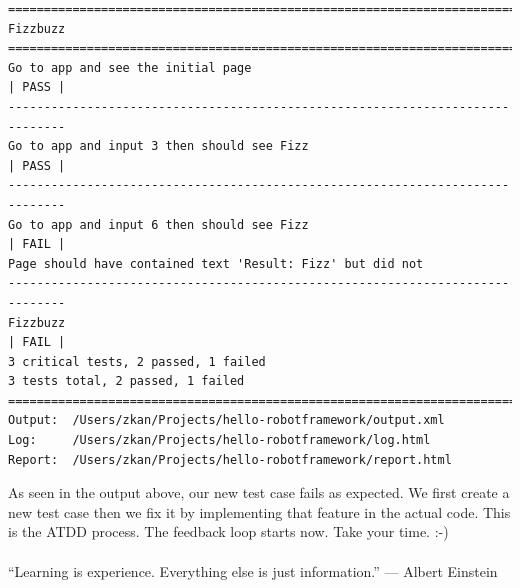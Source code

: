 \documentclass{article}
\begin{document}
\begin{verbatim}
==============================================================================
Fizzbuzz
==============================================================================
Go to app and see the initial page                                    | PASS |
------------------------------------------------------------------------------
Go to app and input 3 then should see Fizz                            | PASS |
------------------------------------------------------------------------------
Go to app and input 6 then should see Fizz                            | FAIL |
Page should have contained text 'Result: Fizz' but did not
------------------------------------------------------------------------------
Fizzbuzz                                                              | FAIL |
3 critical tests, 2 passed, 1 failed
3 tests total, 2 passed, 1 failed
==============================================================================
Output:  /Users/zkan/Projects/hello-robotframework/output.xml
Log:     /Users/zkan/Projects/hello-robotframework/log.html
Report:  /Users/zkan/Projects/hello-robotframework/report.html
\end{verbatim}

\noindent As seen in the output above, our new test case fails as expected. We
first create a new test case then we fix it by implementing that feature in the
actual code. This is the ATDD process. The feedback loop starts now.  Take your
time. :-) \\\\

\noindent ``Learning is experience. Everything else is just information.'' ---
Albert Einstein
\end{document}
